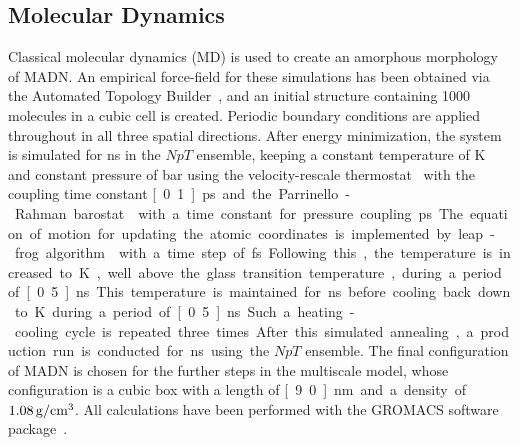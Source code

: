 \documentclass[%
 reprint,
superscriptaddress,
 amsmath,amssymb,
 aps,
prb,
floatfix
]{revtex4-2}
\begin{document}
\subsection{Molecular Dynamics}
Classical molecular dynamics (MD) is used to create an amorphous morphology of MADN. An empirical force-field for these simulations has been obtained via the Automated Topology Builder~\cite{stroet_automated_2018}, and an initial structure containing 1000 molecules in a cubic cell is created. Periodic boundary conditions are applied throughout in all three spatial directions. 
After energy minimization, the system is simulated for \unit[1]{ns} in the $NpT$ ensemble, keeping a constant temperature of \unit[300]{K} and constant pressure of \unit[1]{bar} using the velocity-rescale thermostat~\cite{bussi_canonical_2007} with the coupling time constant \unit[0.1]{ps} and the Parrinello-Rahman barostat~\cite{parrinello_polymorphic_1981} with a time constant for pressure coupling \unit[2]{ps}. The equation of motion for updating the atomic coordinates is implemented by leap-frog algorithm~\cite{van_gunsteren_leap} with a time step of \unit[1]{fs}. Following this, the temperature is increased to \unit[800]{K}, well above the glass transition temperature, during a period of \unit[0.5]{ns}. This temperature is maintained for \unit[1]{ns} before cooling back down to \unit[300]{K} during a period of \unit[0.5]{ns}. Such a heating-cooling cycle is repeated three times. After this simulated annealing, a production run is conducted for \unit[2]{ns} using the $NpT$ ensemble. The final configuration of MADN is chosen for the further steps in the multiscale model, whose configuration is a cubic box with a length of \unit[9.0]{nm} and a density of $\unit[1.08]{g/cm^3}$. All calculations have been performed with the GROMACS software package~\cite{berendsen_gromacs_1995}.
\end{document}
